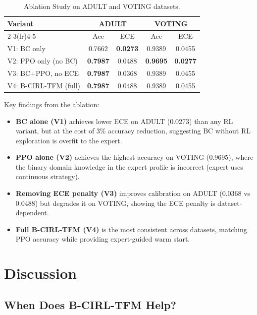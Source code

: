 \documentclass[conference]{IEEEtran}
\begin{document}
\begin{table}[h]
\caption{Ablation Study on ADULT and VOTING datasets.}
\label{tab:ablation}
\centering
\small
\setlength{\tabcolsep}{4pt}
\begin{tabular}{lcccc}
\toprule
\multirow{2}{*}{\textbf{Variant}} &
\multicolumn{2}{c}{\textbf{ADULT}} &
\multicolumn{2}{c}{\textbf{VOTING}} \\
\cmidrule(lr){2-3}\cmidrule(lr){4-5}
& Acc & ECE & Acc & ECE \\
\midrule
V1: BC only                & 0.7662 & \textbf{0.0273} & 0.9389 & 0.0455 \\
V2: PPO only (no BC)       & \textbf{0.7987} & 0.0488 & \textbf{0.9695} & \textbf{0.0277} \\
V3: BC+PPO, no ECE         & \textbf{0.7987} & 0.0368 & 0.9389 & 0.0455 \\
V4: B-CIRL-TFM (full)     & \textbf{0.7987} & 0.0488 & 0.9389 & 0.0455 \\
\bottomrule
\end{tabular}
\end{table}

Key findings from the ablation:
\begin{itemize}
    \item \textbf{BC alone (V1)} achieves lower ECE on ADULT (0.0273) than
    any RL variant, but at the cost of 3\% accuracy reduction, suggesting
    BC without RL exploration is overfit to the expert.
    \item \textbf{PPO alone (V2)} achieves the highest accuracy on VOTING
    (0.9695), where the binary domain knowledge in the expert profile is
    incorrect (expert uses continuous strategy).
    \item \textbf{Removing ECE penalty (V3)} improves calibration on ADULT
    (0.0368 vs 0.0488) but degrades it on VOTING, showing the ECE penalty
    is dataset-dependent.
    \item \textbf{Full B-CIRL-TFM (V4)} is the most consistent across
    datasets, matching PPO accuracy while providing expert-guided warm start.
\end{itemize}



\section{Discussion}

\subsection{When Does B-CIRL-TFM Help?}
\end{document}
